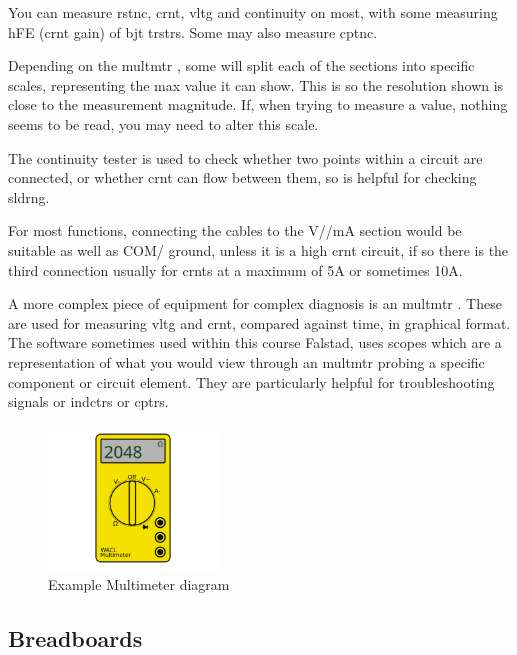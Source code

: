 \documentclass[a4paper,11pt]{report}
\begin{document}
You can measure \gls{rstnc}, \gls{crnt}, \gls{vltg} and continuity on most, with some measuring hFE (\gls{crnt} gain) of \gls{bjt} \gls{trstr}s. Some may also measure \gls{cptnc}.

Depending on the \gls{multmtr} , some will split each of the sections into specific scales, representing the max value it can show. This is so the resolution shown is close to the measurement magnitude. If, when trying to measure a value, nothing seems to be read, you may need to alter this scale.

The continuity tester is used to check whether two points within a circuit are connected, or whether \gls{crnt} can flow between them, so is helpful for checking \gls{sldrng}.

For most functions, connecting the cables to the V/\ohm/mA section would be suitable as well as COM/ ground, unless it is a high \gls{crnt} circuit, if so there is the third connection usually for \gls{crnt}s at a maximum of 5A or sometimes 10A.

A more complex piece of equipment for complex diagnosis is an  \gls{multmtr} . These are used for measuring \gls{vltg} and \gls{crnt}, compared against time, in graphical format. The software sometimes used within this course Falstad, uses scopes which are a representation of what you would view through an  \gls{multmtr}  probing a specific component or circuit element. They are particularly helpful for troubleshooting signals or \gls{indctr}s or \gls{cptr}s.

\begin{figure}[H]
\centering
\includegraphics[width=0.4\textwidth]{multimeter1}
\caption{Example Multimeter diagram}
\end{figure}

\vspace*{1\baselineskip}

\subsection{Breadboards}
\end{document}
